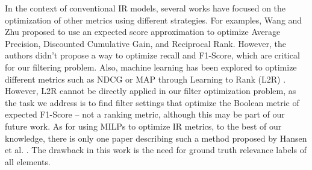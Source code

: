 



In the context of conventional IR models, several works have focused on the optimization of other metrics using different strategies. 
For examples, Wang and Zhu \cite{Wang2010} proposed  to use an expected score approximation to optimize Average Precision, Discounted Cumulative Gain, and Reciprocal Rank. However, the authors didn't propose a way to optimize recall and F1-Score, which are critical for our filtering problem.
Also, machine learning has been explored to optimize different metrics such as NDCG or MAP through Learning to Rank (L2R) \cite{Baeza-Yates2010}. 
However, L2R cannot be directly applied in our filter optimization problem, as the task we address is to find filter settings that optimize the Boolean metric of expected F1-Score -- not a ranking metric, although this may be part of our future work. 
As for using MILPs to optimize IR metrics, to the best of our knowledge, there is only one paper describing such a method proposed by Hansen et al. \cite{Hansen1991}. The drawback in this work is the need for ground truth relevance labels of all elements.






